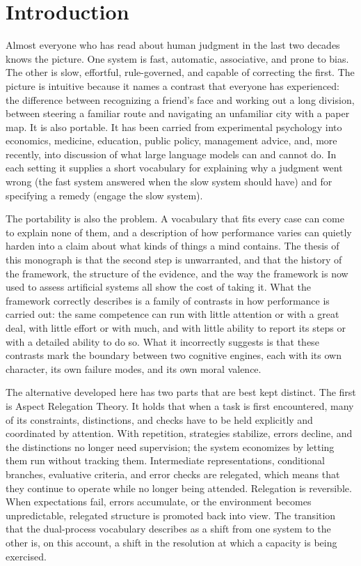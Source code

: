 \documentclass[11pt]{report}
\theoremstyle{remark}
\theoremstyle{definition}
\begin{document}
\tableofcontents

\chapter{Introduction}\label{ch:intro}

Almost everyone who has read about human judgment in the last two decades knows the picture. One system is fast, automatic, associative, and prone to bias. The other is slow, effortful, rule-governed, and capable of correcting the first. The picture is intuitive because it names a contrast that everyone has experienced: the difference between recognizing a friend's face and working out a long division, between steering a familiar route and navigating an unfamiliar city with a paper map. It is also portable. It has been carried from experimental psychology into economics, medicine, education, public policy, management advice, and, more recently, into discussion of what large language models can and cannot do. In each setting it supplies a short vocabulary for explaining why a judgment went wrong (the fast system answered when the slow system should have) and for specifying a remedy (engage the slow system).

The portability is also the problem. A vocabulary that fits every case can come to explain none of them, and a description of how performance varies can quietly harden into a claim about what kinds of things a mind contains. The thesis of this monograph is that the second step is unwarranted, and that the history of the framework, the structure of the evidence, and the way the framework is now used to assess artificial systems all show the cost of taking it. What the framework correctly describes is a family of contrasts in how performance is carried out: the same competence can run with little attention or with a great deal, with little effort or with much, and with little ability to report its steps or with a detailed ability to do so. What it incorrectly suggests is that these contrasts mark the boundary between two cognitive engines, each with its own character, its own failure modes, and its own moral valence.

The alternative developed here has two parts that are best kept distinct. The first is Aspect Relegation Theory. It holds that when a task is first encountered, many of its constraints, distinctions, and checks have to be held explicitly and coordinated by attention. With repetition, strategies stabilize, errors decline, and the distinctions no longer need supervision; the system economizes by letting them run without tracking them. Intermediate representations, conditional branches, evaluative criteria, and error checks are relegated, which means that they continue to operate while no longer being attended. Relegation is reversible. When expectations fail, errors accumulate, or the environment becomes unpredictable, relegated structure is promoted back into view. The transition that the dual-process vocabulary describes as a shift from one system to the other is, on this account, a shift in the resolution at which a capacity is being exercised.
\end{document}
